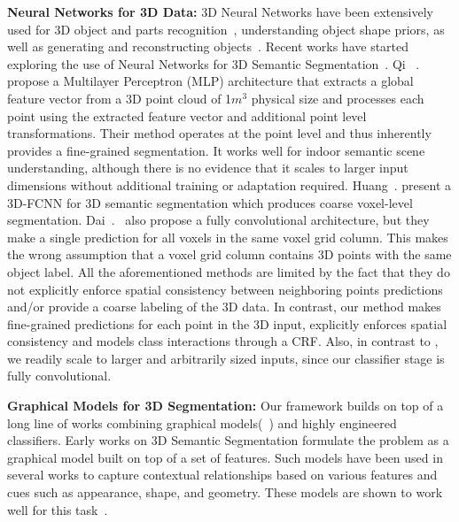 \documentclass[10pt,twocolumn,letterpaper]{article}
\newcommand{\fccrf}[0]{CRF\xspace}
\newcommand{\threedfcnn}[0]{3D-FCNN\xspace}
\begin{document}
\textbf{Neural Networks for 3D Data:} 3D Neural Networks have been extensively used for 3D object and parts recognition~\cite{DeepSlidingShapes, qi2016volumetric, maturana_iros_2015, Guo2015, DBLP:journals/corr/QiSMG16, Garcia}, understanding object shape priors, as well as generating and reconstructing objects~\cite{Yan2016, 3dgan, fan2016, 3dinterpreter, choy20163d}. Recent works have started exploring the use of Neural Networks for 3D Semantic Segmentation~\cite{DBLP:journals/corr/QiSMG16, dai2017scannet, J.Huang2016}. Qi ~\etal.~\cite{DBLP:journals/corr/QiSMG16} propose a Multilayer Perceptron (MLP) architecture that extracts a global feature vector from a 3D point cloud of 1$m^3$ physical size and processes each point using the extracted feature vector and additional point level transformations. Their method operates at the point level and thus inherently provides a fine-grained segmentation. It works well for indoor semantic scene understanding, although there is no evidence that it scales to larger input dimensions without additional training or adaptation required. Huang~\etal. \cite{J.Huang2016} present a \threedfcnn for 3D semantic segmentation which produces coarse voxel-level segmentation. Dai~\etal.~\cite{dai2017scannet} also propose a fully convolutional architecture, but they make a single prediction for all voxels in the same voxel grid column. This makes the wrong assumption that a voxel grid column contains 3D points with the same object label. All the aforementioned methods are limited by the fact that they do not explicitly enforce spatial consistency between neighboring points predictions and/or provide a coarse labeling of the 3D data. In contrast, our method makes fine-grained predictions for each point in the 3D input, explicitly enforces spatial consistency and models class interactions through a \fccrf. Also, in contrast to \cite{DBLP:journals/corr/QiSMG16}, we readily scale to larger and arbitrarily sized inputs, since our classifier stage is fully convolutional.

\textbf{Graphical Models for 3D Segmentation:} Our framework builds on top of a long line of works combining graphical models(~\cite{Taskar2004, Taskar2003,Lafferty2001CRF,Felzenszwalb2004,Ladicky2014}) and highly engineered classifiers. Early works on 3D Semantic Segmentation formulate the problem as a graphical model built on top of a set of features. Such models have been used in several works to capture contextual relationships based on various features and cues such as appearance, shape, and geometry. These models are shown to work well for this task~\cite{Munoz2009,Munoz2008, Koppula2011, Shapovalov2010, Lu2012,Anand2013,munoz-eccv-12}.
\end{document}
